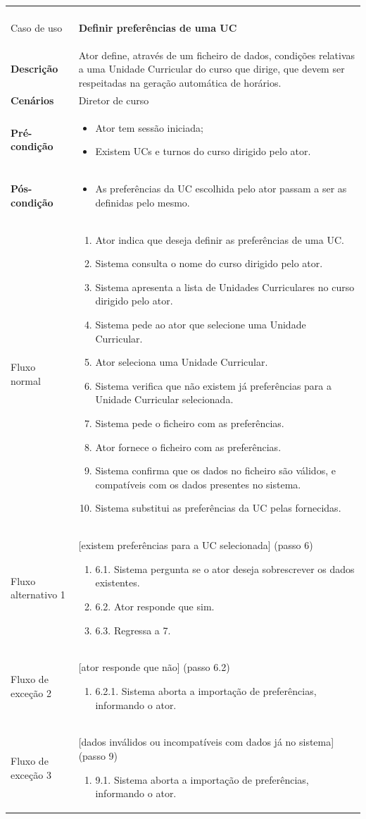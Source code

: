 \documentclass[12pt, a4paper]{article}
\newenvironment{condition}{
    \begin{itemize}[wide=0pt]
        \vspace{-0.2cm}
}{
        \vspace{-0.5cm}
    \end{itemize}
}
\newcommand\flow[1]{
    Fluxo normal &
    \vspace{-0.9cm}
    \singlespacing
    \begin{enumerate}[wide=0pt]
        #1
        \vspace{-0.3cm}
    \end{enumerate} \\ \hline
}
\newcommand\otherflow[3]{
    #1 &
    #2
    \singlespacing
    \begin{enumerate}[wide=0pt]
        #3
        \vspace{-0.3cm}
    \end{enumerate} \\ \hline
}
\newenvironment{usecase}[5]{
    \begin{longtable}{|>{\centering\arraybackslash\bf}m{3cm}|m{13cm}|}
        \multicolumn{2}{c}{\ldots Continua \ldots} \\
        \endfoot
        \endlastfoot

        \hline
        Caso de uso & \textbf{#1} \\

        \hline
        Descrição & #2 \\

        \hline
        Cenários & #3 \\

        \hline
        Pré-condição &
        \vspace{-0.8cm}
        \begin{condition}
            #4
        \end{condition} \\

        \hline
        Pós-condição &
        \vspace{-0.8cm}
        \begin{condition}
            #5
        \end{condition} \\

        \hline
}{
\end{longtable}
}
\begin{document}
\pagebreak

\begin{usecase}
    {Definir preferências de uma UC}
    {
        Ator define, através de um ficheiro de dados, condições relativas a uma Unidade Curricular
        do curso que dirige, que devem ser respeitadas na geração automática de horários.
    }
    {Diretor de curso}
    {
        \item Ator tem sessão iniciada;
        \item Existem UCs e turnos do curso dirigido pelo ator.
    }
    {\item As preferências da UC escolhida pelo ator passam a ser as definidas pelo mesmo.}

    \flow{
        \item Ator indica que deseja definir as preferências de uma UC.
        \item Sistema consulta o nome do curso dirigido pelo ator.
        \item Sistema apresenta a lista de Unidades Curriculares no curso dirigido pelo ator.
        \item Sistema pede ao ator que selecione uma Unidade Curricular.
        \item Ator seleciona uma Unidade Curricular.
        \item Sistema verifica que não existem já preferências para a Unidade Curricular
            selecionada.
        \item Sistema pede o ficheiro com as preferências.
        \item Ator fornece o ficheiro com as preferências.
        \item Sistema confirma que os dados no ficheiro são válidos, e compatíveis com os dados
            presentes no sistema.
        \item Sistema substitui as preferências da UC pelas fornecidas.
    }

    \otherflow{Fluxo alternativo 1}{[existem preferências para a UC selecionada] (passo 6)}{
        \item[6.1.] Sistema pergunta se o ator deseja sobrescrever os dados existentes.
        \item[6.2.] Ator responde que sim.
        \item[6.3.] Regressa a 7.
    }

    \otherflow{Fluxo de exceção 2}{[ator responde que não] (passo 6.2)}{
        \item[6.2.1.] Sistema aborta a importação de preferências, informando o ator.
    }

    \otherflow{Fluxo de exceção 3}
        {[dados inválidos ou incompatíveis com dados já no sistema] (passo 9)}{

        \item[9.1.] Sistema aborta a importação de preferências, informando o ator.
    }
\end{usecase}
\end{document}

